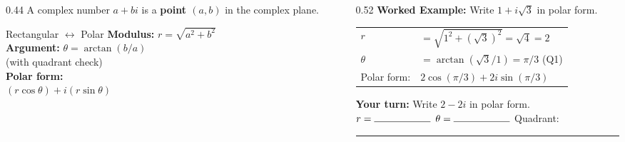 \documentclass[aspectratio=169, 11pt]{beamer}
\begin{document}
\begin{frame}[t, plain]

  \begin{columns}[T]
    \begin{column}{0.44\textwidth}
      A complex number $a+bi$ is a \textbf{point $(a,b)$} in the complex plane.

      \vspace{0.25cm}
      \begin{block}{Rectangular $\leftrightarrow$ Polar}
        \textbf{Modulus:} $r = \sqrt{a^2+b^2}$\\[4pt]
        \textbf{Argument:} $\theta = \arctan(b/a)$\\
        \hspace{1.8cm}(with quadrant check)\\[6pt]
        \textbf{Polar form:}\\
        $(r\cos\theta) + i(r\sin\theta)$
      \end{block}
    \end{column}

    \begin{column}{0.52\textwidth}
      \textbf{Worked Example:} Write $1 + i\sqrt{3}$ in polar form.

      \vspace{0.2cm}
      \begin{tabular}{ll}
        $r$ & $= \sqrt{1^2 + (\sqrt{3})^2} = \sqrt{4} = 2$ \\[6pt]
        $\theta$ & $= \arctan(\sqrt{3}/1) = \pi/3$ \quad (Q1) \\[6pt]
        Polar form: & $2\cos(\pi/3) + 2i\sin(\pi/3)$
      \end{tabular}

      \vspace{0.4cm}
      \textbf{Your turn:} Write $2-2i$ in polar form.\\[4pt]
      $r = \rule{2cm}{0.4pt}$ \quad $\theta = \rule{2cm}{0.4pt}$ \quad Quadrant: \rule{1cm}{0.4pt}
    \end{column}
  \end{columns}
\end{frame}
\end{document}
